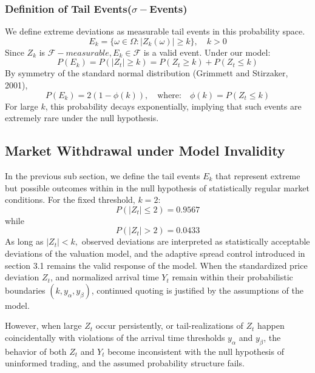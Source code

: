 \documentclass[12pt]{article}
\theoremstyle{plain}
\theoremstyle{definition}
\numberwithin{equation}{section}
\begin{document}
\subsubsection{Definition of Tail Events($\sigma-$Events)}
We define extreme deviations as measurable tail events in this probability space.
\begin{equation}
E_k = \{ \omega \in \Omega: |Z_k(\omega)| \ge k
\}, \quad k>0
\end{equation}
Since $Z_k$ is $\mathcal{F}-measurable, E_k \in \mathcal{F}$ is a valid event. Under our model: 
\begin{equation}
P(E_k) = P(|Z_t|\ge k) = P(Z_t \ge k) + P(Z_t \le k)
\end{equation}
By symmetry of the standard normal distribution (Grimmett and Stirzaker, 2001),
\begin{equation}
P(E_k) = 2(1 - \phi(k)), \quad \text{where:} \quad \phi(k) = P(Z_t \le k)
\end{equation}
For large $k$, this probability decays exponentially, implying that such events are extremely rare under the null hypothesis.
\subsection{Market Withdrawal under Model Invalidity}
In the previous sub section, we define the tail events $E_k$ that represent extreme but possible outcomes within in the null hypothesis of statistically regular market conditions. For the fixed threshold, $k =2$:
\begin{equation}
P(|Z_t| \le 2) = 0.9567
\end{equation}
while
\begin{equation}
P(|Z_t| > 2) = 0.0433
\end{equation}
As long as $|Z_t| < k,$ observed deviations are interpreted as statistically acceptable deviations of the valuation model, and the adaptive spread control introduced in section 3.1 remains the valid response of the model. When the standardized price deviation $Z_t$, and normalized arrival time $Y_t$ remain within their probabilistic boundaries $(k, y_\alpha,y_\beta )$, continued quoting is justified by the assumptions of the model.

However, when large $Z_t$ occur persistently, or tail-realizations of $Z_t$ happen coincidentally with violations of the arrival time thresholds $y_\alpha$ and $y_\beta$, the behavior of both $Z_t$ and $Y_t$ become inconsistent with the null hypothesis of uninformed trading, and the assumed probability structure fails.
\end{document}
